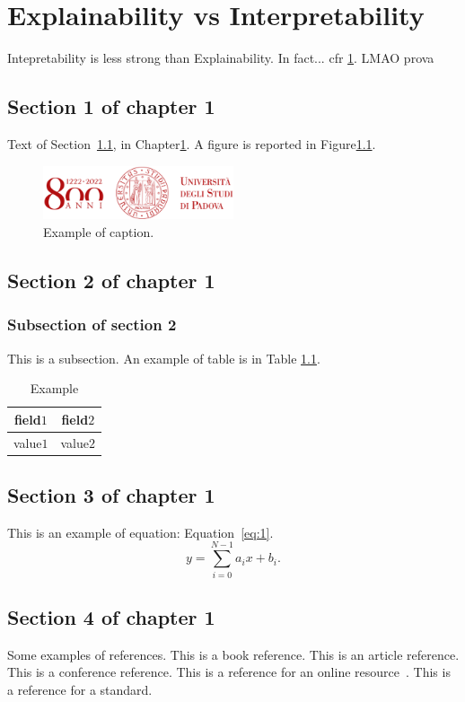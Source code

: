 
\chapter{Explainability vs Interpretability}\label{chapt:1}
Intepretability is less strong than Explainability. In fact... cfr \ref{chapt:1}.
LMAO prova

\section{Section 1 of chapter 1}\label{sect:1_1}  

Text of Section~\ref{sect:1_1}, in Chapter\ref{chapt:1}. 
A figure is reported in Figure\ref{fig:1}.

\begin{figure}[h!]
\centering
\includegraphics[width=0.5\textwidth]{figures/example.png}
\caption[Example of caption.]{Example of caption.\label{fig:1}}
\end{figure}

\section{Section 2 of chapter 1}\label{sect:1_2} 
\subsection{Subsection of section 2}\label{subsect:1_2_1} 
This is a subsection.
An example of table is in Table \ref{tab:1}. 
\begin{table}
\centering
\begin{tabular}{c|c}
\toprule
field$1$ & field$2$ \\ \midrule
value$1$ & value$2$ \\
\bottomrule
\end{tabular}
\caption{Example}
\label{tab:1}
\end{table}

\section{Section 3 of chapter 1}\label{sect:1_3} 
This is an example of equation: Equation~\ref{eq:1}.
\begin{equation}
\label{eq:1}
    y = \sum_{i=0}^{N-1}a_ix + b_i.
\end{equation}

\section{Section 4 of chapter 1}\label{sect:1_4} 
Some examples of references. 
This is a book reference\cite{book1}.  
This is an article reference\cite{article1}.  
This is a conference reference\cite{conference1}.  
This is a reference for an online resource~\cite{online1}.  
This is a reference for a standard\cite{standard1}.  




